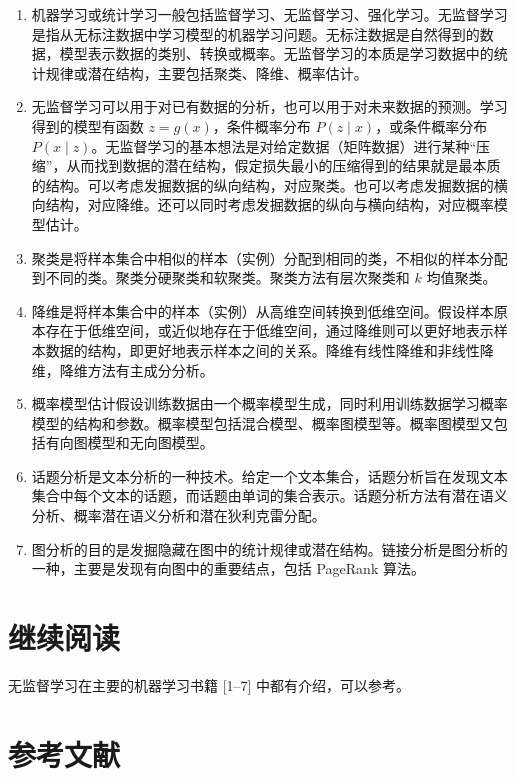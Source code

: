 \documentclass[UTF8,12pt,a4paper,fontset=fandol]{ctexart}
\begin{document}
\begin{enumerate}
  \item 机器学习或统计学习一般包括监督学习、无监督学习、强化学习。无监督学习是指从无标注数据中学习模型的机器学习问题。无标注数据是自然得到的数据，模型表示数据的类别、转换或概率。无监督学习的本质是学习数据中的统计规律或潜在结构，主要包括聚类、降维、概率估计。
  \item 无监督学习可以用于对已有数据的分析，也可以用于对未来数据的预测。学习得到的模型有函数 $z=g(x)$，条件概率分布 $P(z\mid x)$，或条件概率分布 $P(x\mid z)$。无监督学习的基本想法是对给定数据（矩阵数据）进行某种“压缩”，从而找到数据的潜在结构，假定损失最小的压缩得到的结果就是最本质的结构。可以考虑发掘数据的纵向结构，对应聚类。也可以考虑发掘数据的横向结构，对应降维。还可以同时考虑发掘数据的纵向与横向结构，对应概率模型估计。
  \item 聚类是将样本集合中相似的样本（实例）分配到相同的类，不相似的样本分配到不同的类。聚类分硬聚类和软聚类。聚类方法有层次聚类和 $k$ 均值聚类。
  \item 降维是将样本集合中的样本（实例）从高维空间转换到低维空间。假设样本原本存在于低维空间，或近似地存在于低维空间，通过降维则可以更好地表示样本数据的结构，即更好地表示样本之间的关系。降维有线性降维和非线性降维，降维方法有主成分分析。
  \item 概率模型估计假设训练数据由一个概率模型生成，同时利用训练数据学习概率模型的结构和参数。概率模型包括混合模型、概率图模型等。概率图模型又包括有向图模型和无向图模型。
  \item 话题分析是文本分析的一种技术。给定一个文本集合，话题分析旨在发现文本集合中每个文本的话题，而话题由单词的集合表示。话题分析方法有潜在语义分析、概率潜在语义分析和潜在狄利克雷分配。
  \item 图分析的目的是发掘隐藏在图中的统计规律或潜在结构。链接分析是图分析的一种，主要是发现有向图中的重要结点，包括 PageRank 算法。
\end{enumerate}

\section*{继续阅读}

无监督学习在主要的机器学习书籍 [1--7] 中都有介绍，可以参考。

\section*{参考文献}
\end{document}
